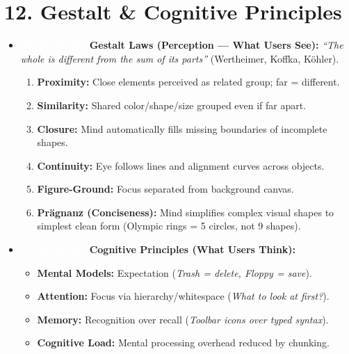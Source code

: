 \documentclass[8.5pt,a4paper,twocolumn]{article}
\newcommand{\tagmem}{\colorbox{accentred}{\textcolor{white}{\bfseries\fontsize{5.5pt}{6.5pt}\selectfont MEMORIZE}}\ }
\begin{document}
\section*{12. Gestalt \& Cognitive Principles}
\begin{itemize}[leftmargin=7pt, itemsep=1pt, topsep=0.5pt]
    \item \tagmem \textbf{Gestalt Laws (Perception --- What Users See):} \textit{``The whole is different from the sum of its parts''} (Wertheimer, Koffka, Köhler).
    \begin{enumerate}[leftmargin=8pt, itemsep=0.5pt]
        \item \textbf{Proximity:} Close elements perceived as related group; far = different.
        \item \textbf{Similarity:} Shared color/shape/size grouped even if far apart.
        \item \textbf{Closure:} Mind automatically fills missing boundaries of incomplete shapes.
        \item \textbf{Continuity:} Eye follows lines and alignment curves across objects.
        \item \textbf{Figure-Ground:} Focus separated from background canvas.
        \item \textbf{Prägnanz (Conciseness):} Mind simplifies complex visual shapes to simplest clean form (Olympic rings = 5 circles, not 9 shapes).
    \end{enumerate}
    \item \tagmem \textbf{Cognitive Principles (What Users Think):}
    \begin{itemize}[leftmargin=6pt, itemsep=0.5pt]
        \item \textbf{Mental Models:} Expectation (\textit{Trash = delete, Floppy = save}).
        \item \textbf{Attention:} Focus via hierarchy/whitespace (\textit{What to look at first?}).
        \item \textbf{Memory:} Recognition over recall (\textit{Toolbar icons over typed syntax}).
        \item \textbf{Cognitive Load:} Mental processing overhead reduced by chunking.
    \end{itemize}
\end{itemize}
\end{document}

